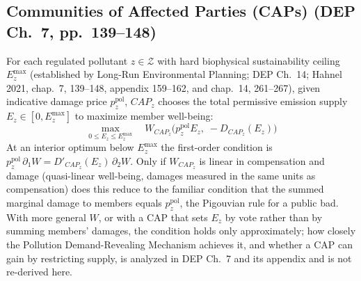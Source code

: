 \documentclass[10pt,twoside,openany]{book}
\theoremstyle{dpepstyle}
\begin{document}
\subsection{Communities of Affected Parties (CAPs) (DEP Ch.~7, pp.~139--148)}
For each regulated pollutant $z \in \mathcal{Z}$ with hard biophysical sustainability ceiling $E_z^{\max}$ (established by Long-Run Environmental Planning; DEP Ch.~14; Hahnel 2021, chap.~7, 139--148, appendix 159--162, and chap.~14, 261--267), given indicative damage price $p_z^{\text{pol}}$, $CAP_z$ chooses the total permissive emission supply $E_z \in [0, E_z^{\max}]$ to maximize member well-being:
\begin{equation}
  \max_{0 \le E_z \le E_z^{\max}} \quad W_{CAP_z}\Big(p_z^{\text{pol}} E_z, \; -D_{CAP_z}(E_z)\Big)
\end{equation}
At an interior optimum below $E_z^{\max}$ the first-order condition is $p_z^{\text{pol}}\,\partial_1 W = D'_{CAP_z}(E_z)\,\partial_2 W$. Only if $W_{CAP_z}$ is linear in compensation and damage (quasi-linear well-being, damages measured in the same units as compensation) does this reduce to the familiar condition that the summed marginal damage to members equals $p_z^{\text{pol}}$, the Pigouvian rule for a public bad. With more general $W$, or with a CAP that sets $E_z$ by vote rather than by summing members' damages, the condition holds only approximately; how closely the Pollution Demand-Revealing Mechanism achieves it, and whether a CAP can gain by restricting supply, is analyzed in DEP Ch.~7 and its appendix and is not re-derived here.
\end{document}
